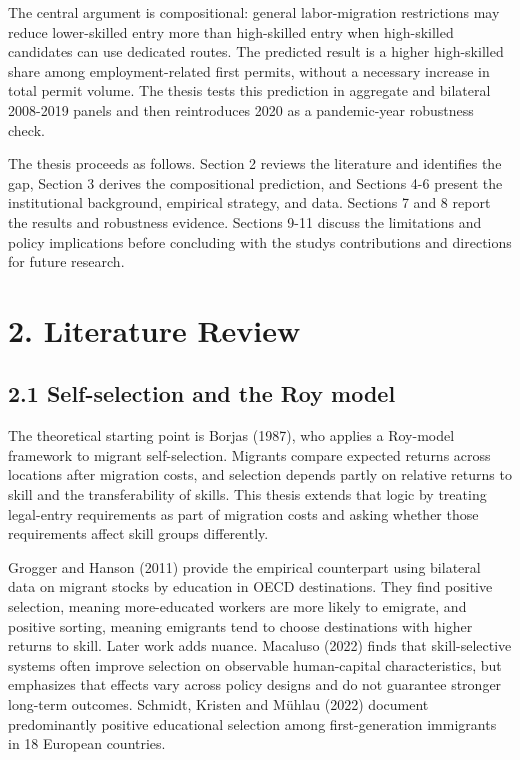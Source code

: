 \documentclass[11pt,a4paper]{article}
\begin{document}
The central argument is compositional: general labor-migration
restrictions may reduce lower-skilled entry more than high-skilled entry
when high-skilled candidates can use dedicated routes. The predicted
result is a higher high-skilled share among employment-related first
permits, without a necessary increase in total permit volume. The thesis
tests this prediction in aggregate and bilateral 2008-2019 panels and
then reintroduces 2020 as a pandemic-year robustness check.

The thesis proceeds as follows. Section 2 reviews the literature and
identifies the gap, Section 3 derives the compositional prediction, and
Sections 4-6 present the institutional background, empirical strategy,
and data. Sections 7 and 8 report the results and robustness evidence.
Sections 9-11 discuss the limitations and policy implications before
concluding with the study\textquotesingle s contributions and directions
for future research.

\endgroup
\section{2. Literature Review}\label{literature-review}

\subsection{2.1 Self-selection and the Roy
model}\label{self-selection-and-the-roy-model}

The theoretical starting point is Borjas (1987), who applies a Roy-model
framework to migrant self-selection. Migrants compare expected returns
across locations after migration costs, and selection depends partly on
relative returns to skill and the transferability of skills. This thesis
extends that logic by treating legal-entry requirements as part of
migration costs and asking whether those requirements affect skill
groups differently.

Grogger and Hanson (2011) provide the empirical counterpart using
bilateral data on migrant stocks by education in OECD destinations. They
find positive selection, meaning more-educated workers are more likely
to emigrate, and positive sorting, meaning emigrants tend to choose
destinations with higher returns to skill. Later work adds nuance.
Macaluso (2022) finds that skill-selective systems often improve
selection on observable human-capital characteristics, but emphasizes
that effects vary across policy designs and do not guarantee stronger
long-term outcomes. Schmidt, Kristen and Mühlau (2022) document
predominantly positive educational selection among first-generation
immigrants in 18 European countries.
\end{document}
